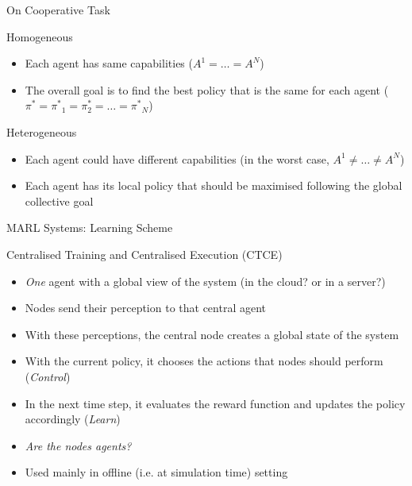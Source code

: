 \documentclass[presentation, 8pt]{beamer}\mode<presentation>{\usetheme{AMSBolognaFC}}
\begin{document}
	\begin{frame}{On Cooperative Task}
		\begin{exampleblock}{Homogeneous}
			\begin{itemize}
				\item Each agent has same capabilities ($A^1 = \dots = A^N$)
				\item The overall goal is to find the best policy that is the same for each agent ($\pi^* = {\pi^{*}}_1 = \pi^{*}_2 = \dots = {\pi^{*}}_N$)
			\end{itemize}
		\end{exampleblock}
		\begin{exampleblock}{Heterogeneous}
			\begin{itemize}
				\item Each agent could have different capabilities (in the worst case, $A^1 \neq \dots \neq A^N$)
				\item Each agent has its local policy that should be maximised following the global collective goal
			\end{itemize}
		\end{exampleblock}
	\end{frame}
	
	\begin{frame}{MARL Systems: Learning Scheme}
		\begin{exampleblock}{Centralised Training and Centralised Execution (CTCE)}
			\begin{itemize}
				\item \emph{One} agent with a global view of the system (in the cloud? or in a server?)
				\item Nodes send their perception to that central agent
				\item With these perceptions, the central node creates a global state of the system
				\item With the current policy, it chooses the actions that nodes should perform (\emph{Control})
				\item In the next time step, it evaluates the reward function and updates the policy accordingly (\emph{Learn})
				\item \emph{Are the nodes agents?}
				\item Used mainly in offline (i.e. at simulation time) setting 
			\end{itemize}
		\end{exampleblock}
	
	\end{frame}
	
\end{document}
